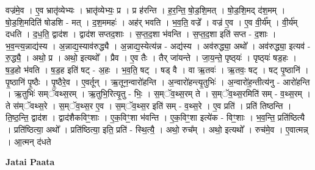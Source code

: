 \documentclass[17pt]{extarticle}
\begin{document}
वज्र॑मे॒व । ए॒व भ्रातृ॑व्येभ्यः । भ्रातृ॑व्येभ्यः॒ प्र । प्र ह॑रन्ति । ह॒र॒न्ति॒ षो॒ड॒शि॒मत् । षो॒ड॒शि॒मद् द॑श॒मम् । षो॒ड॒शि॒मदिति॑ षोडशि - मत् । द॒श॒ममहः॑ । अह॑र् भवति । भ॒व॒ति॒ वज्रे᳚ । वज्र॑ ए॒व । ए॒व वी॒र्य᳚म् । वी॒र्य॑म् दधति । द॒ध॒ति॒ द्वाद॑श । द्वाद॑श सप्तद॒शाः । स॒प्त॒द॒शा भ॑वन्ति । स॒प्त॒द॒शा इति॑ सप्त - द॒शाः । भ॒व॒न्त्य॒न्नाद्य॑स्य । अ॒न्नाद्य॒स्याव॑रुद्ध्यै । अ॒न्नाद्य॒स्येत्य॑न्न - अद्य॑स्य । अव॑रुद्ध्या॒ अथो᳚ । अव॑रुद्ध्या॒ इत्यव॑ - रु॒द्ध्यै॒ । अथो॒ प्र । अथो॒ इत्यथो᳚ । प्रैव । ए॒व तैः । तैर् जा॑यन्ते । जा॒य॒न्ते॒ पृष्ठ्‍यः॑ । पृष्ठ्‍यः॑ षड॒हः । ष॒ड॒हो भ॑वति । ष॒ड॒ह इति॑ षट् - अ॒हः । भ॒व॒ति॒ षट् । षड् वै । वा ऋ॒तवः॑ । ऋ॒तवः॒ षट् । षट् पृ॒ष्ठानि॑ । पृ॒ष्ठानि॑ पृ॒ष्ठैः । पृ॒ष्ठैरे॒व । ए॒वर्तून् । ऋ॒तून॒न्वारो॑हन्ति । अ॒न्वारो॑हन्त्यृ॒तुभिः॑ । अ॒न्वारो॑ह॒न्तीत्य॑नु - आरो॑हन्ति । ऋ॒तुभिः॑ सम्ॅवथ्स॒रम् । ऋ॒तुभि॒रित्यृ॒तु - भिः॒ । स॒म्ॅव॒थ्स॒रम् ते । स॒म्ॅव॒थ्स॒रमिति॑ सम् - व॒थ्स॒रम् । ते स॑म्ॅवथ्स॒रे । स॒म्ॅव॒थ्स॒र ए॒व । स॒म्ॅव॒थ्स॒र इति॑ सम् - व॒थ्स॒रे । ए॒व प्रति॑ । प्रति॑ तिष्ठन्ति । ति॒ष्ठ॒न्ति॒ द्वाद॑श । द्वाद॑शैकविꣳ॒॒शाः । ए॒क॒विꣳ॒॒शा भ॑वन्ति । ए॒क॒विꣳ॒॒शा इत्ये॑क - विꣳ॒॒शाः । भ॒व॒न्ति॒ प्रति॑ष्ठित्यै । प्रति॑ष्ठित्या॒ अथो᳚ । प्रति॑ष्ठित्या॒ इति॒ प्रति॑ - स्थि॒त्यै॒ । अथो॒ रुच᳚म् । अथो॒ इत्यथो᳚ । रुच॑मे॒व । ए॒वात्मन्न् । आ॒त्मन् द॑धते \newline

\textbf{Jatai Paata} \newline
\end{document}
